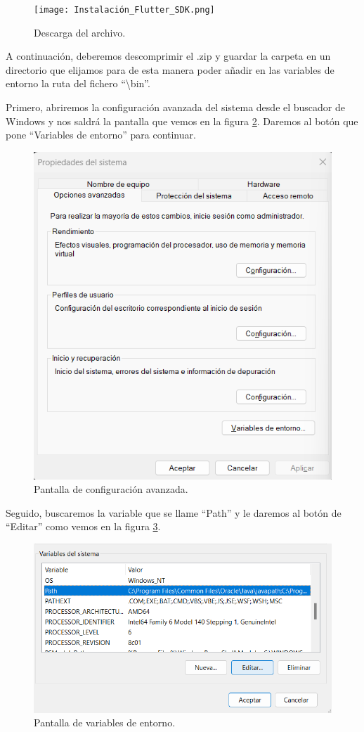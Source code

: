 \begin{figure}[H]
    \centering
    \texttt{[image: Instalación\_Flutter\_SDK.png]}
    \caption{Descarga del archivo.}
    \label{C7}
\end{figure}

A continuación, deberemos descomprimir el .zip y guardar la carpeta en un directorio que elijamos para de esta manera poder añadir en las variables de entorno la ruta del fichero ``\textbackslash bin''.

Primero, abriremos la configuración avanzada del sistema desde el buscador de Windows y nos saldrá la pantalla que vemos en la figura \ref{C8}. Daremos al botón que pone ``Variables de entorno'' para continuar.

\begin{figure}[H]
    \centering
    \includegraphics[width=0.8\linewidth]{Variables_Entorno_1.png}
    \caption{Pantalla de configuración avanzada.}
    \label{C8}
\end{figure}

Seguido, buscaremos la variable que se llame ``Path'' y le daremos al botón de ``Editar'' como vemos en la figura \ref{C9}.

\begin{figure}[H]
    \centering
    \includegraphics[width=0.8\linewidth]{Variables_Entorno_2.png}
    \caption{Pantalla de variables de entorno.}
    \label{C9}
\end{figure}


